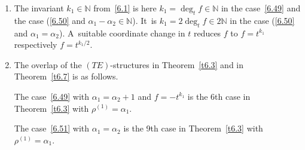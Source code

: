 \documentclass[pdftex]{sigma}%
\numberwithin{equation}{section}
\numberwithin{figure}{section}
\newcommand{\N}{{\mathbb N}}
\begin{document}
\begin{Remarks}
\begin{enumerate}
\item[$(v)$] The invariant $k_1\in\N$ from~\eqref{6.1} is here
$k_1=\deg_t f\in\N$ in the case~\eqref{6.49}
and the case (\eqref{6.50} and $\alpha_1-\alpha_2\in\N$). It~is $k_1=2\deg_t f\in 2\N$ in the case
(\eqref{6.50} and $\alpha_1=\alpha_2$).
A~suitable coordinate change in $t$
reduces $f$ to $f=t^{k_1}$ respectively $f=t^{k_1/2}$.

\item[$(vi)$] The overlap of the $(TE)$-structures in Theorem~\ref{t6.3}
and in Theorem~\ref{t6.7} is as follows.

The case~\eqref{6.49} with $\alpha_1=\alpha_2+1$
and $f=-t^{k_1}$
is the 6th case in Theorem~\ref{t6.3}
with $\rho^{(1)}=\alpha_1$.

The case~\eqref{6.51} with $\alpha_1=\alpha_2$
is the 9th case in Theorem~\ref{t6.3}
with $\rho^{(1)}=\alpha_1$.
\end{enumerate}
\end{Remarks}
\end{document}
